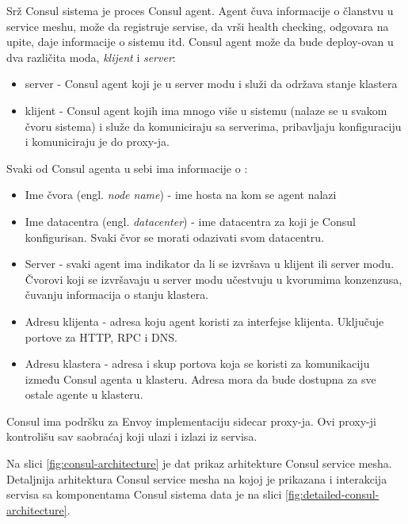 \documentclass[a4paper,12pt]{report}
\begin{document}
Srž Consul sistema je proces Consul agent. Agent čuva informacije o članstvu u service meshu, može da registruje servise, da vrši health checking, odgovara na upite, daje informacije o sistemu itd. Consul agent može da bude deploy-ovan u dva različita moda, \textit{klijent} i \textit{server}: 

\begin{itemize}
	\item server - Consul agent koji je u server modu i služi da održava stanje klastera
	\item klijent - Consul agent kojih ima mnogo više u sistemu (nalaze se u svakom čvoru sistema) i služe da komuniciraju sa serverima, pribavljaju konfiguraciju i komuniciraju je do proxy-ja. 
\end{itemize}

Svaki od Consul agenta u sebi ima informacije o : 

\begin{itemize}
	\item Ime čvora (engl. \textit{node name}) - ime hosta na kom se agent nalazi
	\item Ime datacentra (engl. \textit{datacenter}) - ime datacentra za koji je Consul konfigurisan. Svaki čvor se morati odazivati svom datacentru. 
	\item Server - svaki agent ima indikator da li se izvršava u klijent ili server modu. Čvorovi koji se izvršavaju u server modu učestvuju u kvorumima konzenzusa, čuvanju informacija o stanju klastera. 
	\item Adresu klijenta - adresa koju agent koristi za interfejse klijenta. Uključuje portove za HTTP, RPC i DNS. 
	\item Adresu klastera - adresa i skup portova koja se koristi za komunikaciju između Consul agenta u klasteru. Adresa mora da bude dostupna za sve ostale agente u klasteru.
\end{itemize}

Consul ima podršku za Envoy implementaciju sidecar proxy-ja.  Ovi proxy-ji kontrolišu sav saobraćaj koji ulazi i izlazi iz servisa. \newline

Na slici \ref{fig:consul-architecture} je dat prikaz arhitekture Consul service mesha. Detaljnija arhitektura Consul service mesha na kojoj je prikazana i interakcija servisa sa komponentama Consul sistema data je na slici \ref{fig:detailed-consul-architecture}. \newline
\end{document}
